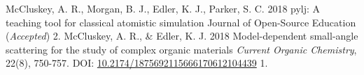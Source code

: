 \begin{cvpubys}
  \cvpuby
	{McCluskey, A. R., Morgan, B. J., Edler, K. J., Parker, S. C.}
	{2018}
	{pylj: A teaching tool for classical atomistic simulation}
	{Journal of Open-Source Education (\emph{Accepted})}
	{2.}
  \cvpuby
    {McCluskey, A. R., \& Edler, K. J.}
    {2018}
    {Model-dependent small-angle scattering for the study of complex organic materials}
	{\emph{Current Organic Chemistry}, 22(8), 750-757. DOI: \href{http://doi.org/10.2174/1875692115666170612104439}{10.2174/1875692115666170612104439}}
    {1.}
\end{cvpubys}
